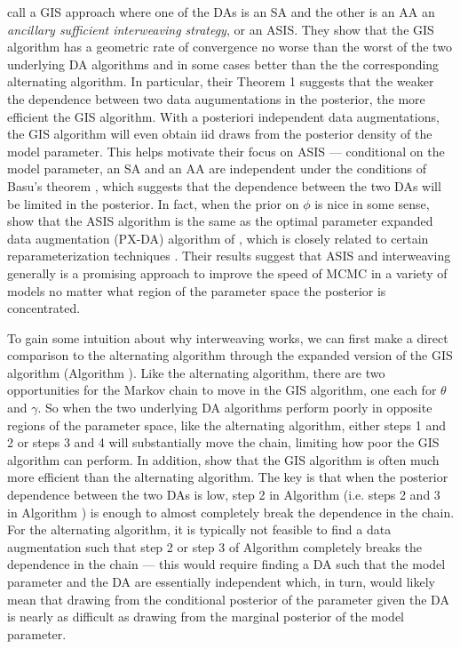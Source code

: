 \documentclass{article}
\begin{document}
 call a GIS approach where one of the DAs is an SA and the other is an AA an {\it ancillary sufficient interweaving strategy}, or an ASIS. They show that the GIS algorithm has a geometric rate of convergence no worse than the worst of the two underlying DA algorithms and in some cases better than the the corresponding alternating algorithm. In particular, their Theorem 1 suggests that the weaker the dependence between two data augumentations in the posterior, the more efficient the GIS algorithm. With a posteriori independent data augmentations, the GIS algorithm will even obtain iid draws from the posterior density of the model parameter. This helps motivate their focus on ASIS --- conditional on the model parameter, an SA and an AA are independent under the conditions of Basu's theorem \cite{basu1955statistics}, which suggests that the dependence between the two DAs will be limited in the posterior. In fact, when the prior on $\phi$ is nice in some sense,  show that the ASIS algorithm is the same as the optimal parameter expanded data augmentation (PX-DA) algorithm of , which is closely related to certain reparameterization techniques  \cite{hobert2008theoretical}. Their results suggest that ASIS and interweaving generally is a promising approach to improve the speed of MCMC in a variety of models no matter what region of the parameter space the posterior is concentrated. 

To gain some intuition about why interweaving works, we can first make a direct comparison to the alternating algorithm through the expanded version of the GIS algorithm (Algorithm ). Like the alternating algorithm, there are two opportunities for the Markov chain to move in the GIS algorithm, one each for $\theta$ and $\gamma$. So when the two underlying DA algorithms perform poorly in opposite regions of the parameter space, like the alternating algorithm, either steps 1 and 2 or steps 3 and 4 will substantially move the chain, limiting how poor the GIS algorithm can perform. In addition,  show that the GIS algorithm is often much more efficient than the alternating algorithm. The key is that when the posterior dependence between the two DAs is low, step 2 in Algorithm  (i.e. steps 2 and 3 in Algorithm ) is enough to almost completely break the dependence in the chain. For the alternating algorithm, it is typically not feasible to find a data augmentation such that step 2 or step 3 of Algorithm  completely breaks the dependence in the chain --- this would require finding a DA such that the model parameter and the DA are essentially independent which, in turn, would likely mean that drawing from the conditional posterior of the parameter given the DA is nearly as difficult as drawing from the marginal posterior of the model parameter.
\end{document}

